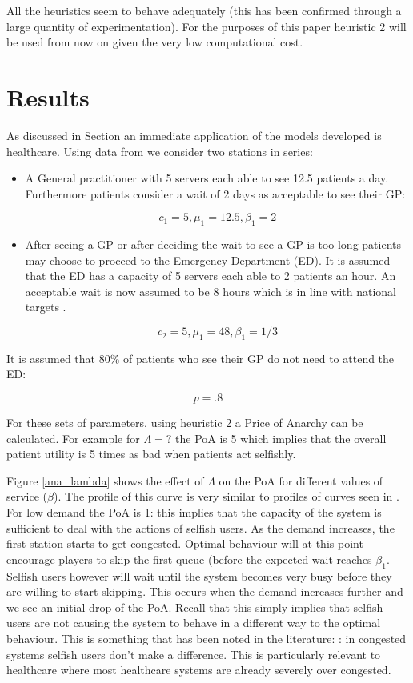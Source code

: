 \documentclass[12pt]{article}
\begin{document}
All the heuristics seem to behave adequately (this has been confirmed through a large quantity of experimentation).
For the purposes of this paper heuristic 2 will be used from now on given the very low computational cost.

\section{Results}\label{results}

As discussed in Section \label{introduction} an immediate application of the models developed is healthcare.
Using data from \cite{} we consider two stations in series:

\begin{itemize}
    \item A General practitioner with 5 servers each able to see 12.5 patients a day. Furthermore patients consider a wait of 2 days as acceptable to see their GP:

        $$c_1=5, \mu_1=12.5, \beta_1=2$$

    \item After seeing a GP or after deciding the wait to see a GP is too long \cite{FINDSOMEPOPNEWSABOUTTHIS} patients may choose to proceed to the Emergency Department (ED). It is assumed that the ED has a capacity of 5 servers each able to 2 patients an hour. An acceptable wait is now assumed to be 8 hours which is in line with national targets \cite{}.

        $$c_2=5, \mu_1=48, \beta_1=1/3$$
\end{itemize}

It is assumed that 80\% of patients who see their GP do not need to attend the ED:

$$p=.8$$

For these sets of parameters, using heuristic 2 a Price of Anarchy can be calculated.
For example for $\Lambda=?$ the PoA is 5 which implies that the overall patient utility is 5 times as bad when patients act selfishly.

Figure \ref{ana_lambda} shows the effect of $\Lambda$ on the PoA for different values of service ($\beta$).
The profile of this curve is very similar to profiles of curves seen in \cite{VKPH}.
For low demand the PoA is 1: this implies that the capacity of the system is sufficient to deal with the actions of selfish users.
As the demand increases, the first station starts to get congested.
Optimal behaviour will at this point encourage players to skip the first queue (before the expected wait reaches $\beta_1$.
Selfish users however will wait until the system becomes very busy before they are willing to start skipping.
This occurs when the demand increases further and we see an initial drop of the PoA.
Recall that this simply implies that selfish users are not causing the system to behave in a different way to the optimal behaviour.
This is something that has been noted in the literature: \cite{bunchofpapers}: in congested systems selfish users don't make a difference.
This is particularly relevant to healthcare where most healthcare systems are already severely over congested.
\end{document}
